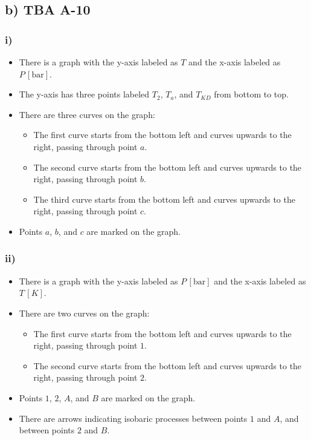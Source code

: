 \subsection*{b) TBA A-10}

\subsubsection*{i)}

\begin{itemize}
    \item There is a graph with the y-axis labeled as $T$ and the x-axis labeled as $P \, [\text{bar}]$.
    \item The y-axis has three points labeled $T_2$, $T_a$, and $T_{KD}$ from bottom to top.
    \item There are three curves on the graph:
        \begin{itemize}
            \item The first curve starts from the bottom left and curves upwards to the right, passing through point $a$.
            \item The second curve starts from the bottom left and curves upwards to the right, passing through point $b$.
            \item The third curve starts from the bottom left and curves upwards to the right, passing through point $c$.
        \end{itemize}
    \item Points $a$, $b$, and $c$ are marked on the graph.
\end{itemize}

\subsubsection*{ii)}

\begin{itemize}
    \item There is a graph with the y-axis labeled as $P \, [\text{bar}]$ and the x-axis labeled as $T \, [K]$.
    \item There are two curves on the graph:
        \begin{itemize}
            \item The first curve starts from the bottom left and curves upwards to the right, passing through point $1$.
            \item The second curve starts from the bottom left and curves upwards to the right, passing through point $2$.
        \end{itemize}
    \item Points $1$, $2$, $A$, and $B$ are marked on the graph.
    \item There are arrows indicating isobaric processes between points $1$ and $A$, and between points $2$ and $B$.
\end{itemize}